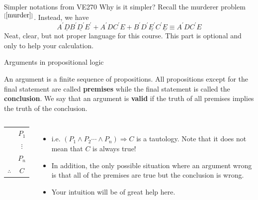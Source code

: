 \begin{frame}{Simpler notations from VE270}
Why is it simpler? Recall the murderer problem$^{[\ref{murder}]}$.
Instead, we have
$$A^\prime \underline{D} B^\prime \underline{D^\prime} E^\prime+A^\prime D C^\prime E+B^\prime D^\prime \underline{E^\prime} C^\prime \underline{E}\equiv A^\prime D C^\prime E$$
Neat, clear, but not proper language for this course. This part is optional and only to help your calculation.
\end{frame}
\fi

\begin{frame}{Arguments in propositional logic}
    \begin{definition}
        An argument is a finite sequence of propositions. All propositions except for the final statement are called \textbf{premises} while the final statement is called the \textbf{conclusion}. We say that an argument is \textbf{valid} if the truth of all premises implies the truth of the conclusion.
    \end{definition}
    
    \begin{columns}[t,onlytextwidth]
        \begin{center}
            \begin{tabular}{cc}
                &$P_1$\\
                &$\vdots$\\
                &$P_n$\\\hline
                $\therefore$ & $C$
            \end{tabular}
        \end{center}

        \begin{itemize}
            \item 
            i.e. $(P_1\wedge P_2\cdots\wedge P_n)\Rightarrow C$ is a tautology. Note that it does not mean that $C$ is always true!
            \item
            In addition, the only possible situation where an argument wrong is that all of the premises are true but the conclusion is wrong.
            \item
            Your intuition will be of great help here.
        \end{itemize}
        \end{columns}
\end{frame}

